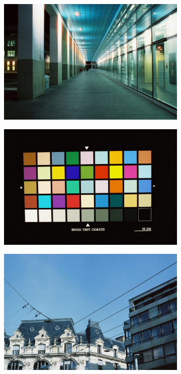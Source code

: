 \begin{figure}
    \begin{subfigure}[t]{.19\textwidth}
      \centering
      \includegraphics[width=\linewidth]{figures/film1.jpeg}
    \end{subfigure}
    \hfill
    \begin{subfigure}[t]{.19\textwidth}
      \centering
      \includegraphics[width=\linewidth]{figures/film2.jpeg}
    \end{subfigure}
    \hfill
    \begin{subfigure}[t]{.19\textwidth}
      \centering
      \includegraphics[width=\linewidth]{figures/film3.jpeg}

\end{subfigure}
\end{figure}
